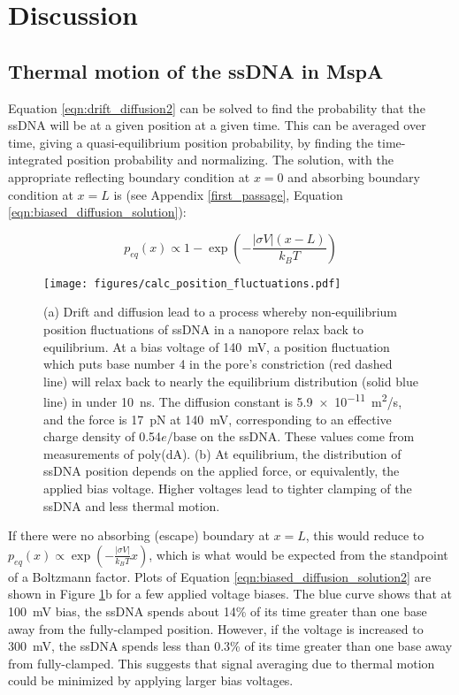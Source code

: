 \section{Discussion}

\subsection{Thermal motion of the ssDNA in MspA}

Equation \ref{eqn:drift_diffusion2} can be solved to find the probability that the ssDNA will be at a given position at a given time.  This can be averaged over time, giving a quasi-equilibrium position probability, by finding the time-integrated position probability and normalizing.  The solution, with the appropriate reflecting boundary condition at $x=0$ and absorbing boundary condition at $x=L$ is (see Appendix \ref{first_passage}, Equation \ref{eqn:biased_diffusion_solution}):

\begin{equation}
p_{eq}(x) \propto 1 - \exp{\left( -\frac{| \sigma V | (x-L)}{k_B T} \right)}
\label{eqn:biased_diffusion_solution2}
\end{equation}

\begin{figure}[h]
\begin{centering}
\texttt{[image: figures/calc\_position\_fluctuations.pdf]}
\caption[Position fluctuations of ssDNA in MspA]{(a) Drift and diffusion lead to a process whereby non-equilibrium position fluctuations of ssDNA in a nanopore relax back to equilibrium.  At a bias voltage of \SI{140}{\mV}, a position fluctuation which puts base number 4 in the pore's constriction (red dashed line) will relax back to nearly the equilibrium distribution (solid blue line) in under \SI{10}{\ns}.  The diffusion constant is \SI{5.9e-11}{\m^2/s}, and the force is \SI{17}{\pico\N} at \SI{140}{\mV}, corresponding to an effective charge density of \num{0.54}$e/\text{base}$ on the ssDNA.  These values come from measurements of poly(dA).  (b) At equilibrium, the distribution of ssDNA position depends on the applied force, or equivalently, the applied bias voltage.  Higher voltages lead to tighter clamping of the ssDNA and less thermal motion.}
\label{fig:position_fluctuations}
\end{centering}
\end{figure}

If there were no absorbing (escape) boundary at $x=L$, this would reduce to $p_{eq}(x) \propto \exp (- \frac{|\sigma V|}{k_B T} x)$, which is what would be expected from the standpoint of a Boltzmann factor.   Plots of Equation \ref{eqn:biased_diffusion_solution2} are shown in Figure \ref{fig:position_fluctuations}b for a few applied voltage biases.  The blue curve shows that at \SI{100}{\mV} bias, the ssDNA spends about 14\% of its time greater than one base away from the fully-clamped position.  However, if the voltage is increased to \SI{300}{\mV}, the ssDNA spends less than 0.3\% of its time greater than one base away from fully-clamped.  This suggests that signal averaging due to thermal motion could be minimized by applying larger bias voltages.

